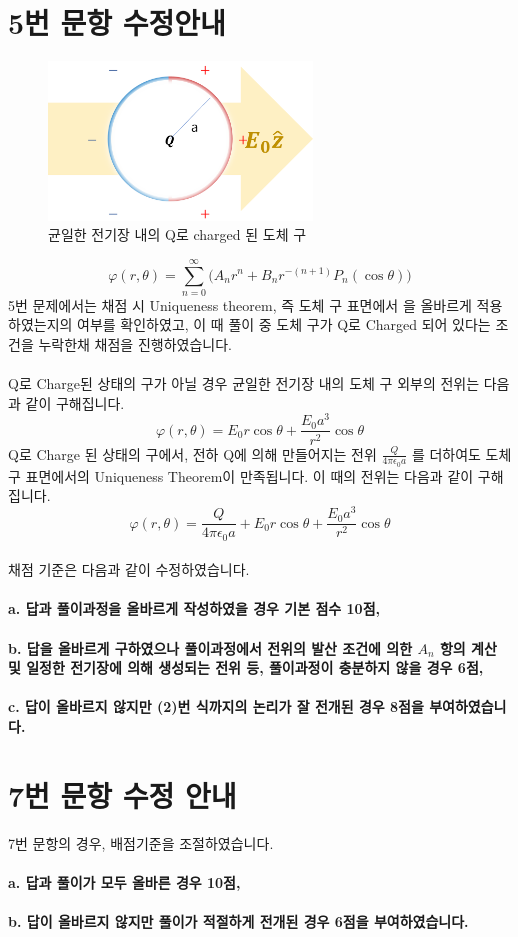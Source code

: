 \documentclass{article}
\begin{document}
\section*{5번 문항 수정안내}
\begin{figure}[!h]
    \centerline{\includegraphics[width=7cm]{EM_Solution_5_edit.png}}
    \caption{균일한 전기장 내의 Q로 charged 된 도체 구}
    \label{figure_1} 
\end{figure}
\begin{equation}
  \varphi(r,\theta) = \sum_{n=0}^{\infty} \bigg( A_nr^n + B_n r^{-(n+1)} P_n(\cos{\theta}) \bigg)
\end{equation}
5번 문제에서는 채점 시 Uniqueness theorem, 즉 도체 구 표면에서 을 올바르게 적용하였는지의 여부를 확인하였고, 이 때 풀이 중 도체 구가 Q로 Charged 되어 있다는 조건을 누락한채 채점을 진행하였습니다.
\\
\\

Q로 Charge된 상태의 구가 아닐 경우 균일한 전기장 내의 도체 구 외부의 전위는 다음과 같이 구해집니다.
\begin{equation}
  \varphi(r,\theta) = E_0 r \cos{\theta} + \frac{E_0 a^3}{r^2} \cos{\theta}
\end{equation}
Q로 Charge 된 상태의 구에서, 전하 Q에 의해 만들어지는 전위 $\frac{Q}{4\pi \epsilon_0 a}$ 를 더하여도 
도체 구 표면에서의 Uniqueness Theorem이 만족됩니다. 이 때의 전위는 다음과 같이 구해집니다.
\begin{equation}
  \varphi(r,\theta) = \frac{Q}{4\pi \epsilon_0 a} + E_0 r \cos{\theta} + \frac{E_0 a^3}{r^2} \cos{\theta}
\end{equation}
\\
채점 기준은 다음과 같이 수정하였습니다. \\ \\
\textbf{
a. 답과 풀이과정을 올바르게 작성하였을 경우 기본 점수 10점,\\\\
b. 답을 올바르게 구하였으나 풀이과정에서 전위의 발산 조건에 의한 $A_n$ 항의 계산 및 일정한 전기장에 의해 생성되는 전위 등,
풀이과정이 충분하지 않을 경우 6점,\\ \\
c. 답이 올바르지 않지만 (2)번 식까지의 논리가 잘 전개된 경우 8점을 부여하였습니다.
}

\section*{7번 문항 수정 안내}
7번 문항의 경우, 배점기준을 조절하였습니다.\\ \\
\textbf{
a. 답과 풀이가 모두 올바른 경우 10점,\\ \\  
b. 답이 올바르지 않지만 풀이가 적절하게 전개된 경우 6점을 부여하였습니다. \\ \\
}

  
\end{document}
